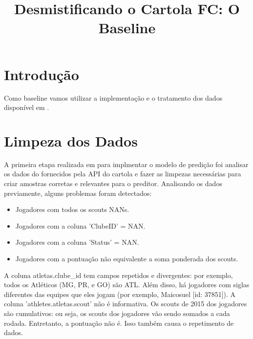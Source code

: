 \documentclass[conference]{IEEEtran}
\begin{document}
\title{Desmistificando o Cartola FC: O Baseline}

\author
{
  \and
  \and
  \and
}

\maketitle

\section{Introdução}

Como baseline vamos utilizar a implementação e o tratamento dos dados disponível em \cite{git_cartola}.


\section{Limpeza dos Dados}

A primeira etapa realizada em \cite{git_cartola} para implmentar o modelo de predição foi analisar os dados do fornecidos pela API do cartola e fazer as limpezas necessárias para criar amostras corretas e relevantes para o preditor. Analisando os dados previamente, alguns problemas foram detectados:

\begin{itemize}
	\item Jogadores com todos os scouts NANs.
	\item Jogadores com a coluna 'ClubeID' = NAN.
	\item Jogadores com a coluna 'Status' = NAN.
	\item Jogadores com a pontuação não equivalente a soma ponderada dos scouts.
\end{itemize}

A coluna  atletas.clube\_id tem campos repetidos e divergentes: por exemplo, todos os Atléticos (MG, PR, e GO) são ATL. Além disso, há jogadores com siglas diferentes das equipes que eles jogam (por exemplo, Maicosuel [id: 37851]).
A coluna 'athletes.atletas.scout' não é informativa.
Os scouts de 2015 dos jogadores são cumulativos: ou seja, os scouts dos jogadores vão sendo somados a cada rodada. Entretanto, a pontuação não é. Isso também causa o repetimento de dados.
\end{document}
